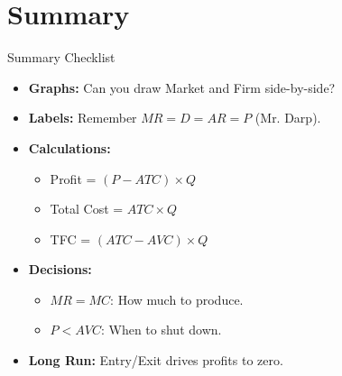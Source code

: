 \documentclass[aspectratio=169, 10pt]{beamer}
\begin{document}
\section{Summary}

\begin{frame}{Summary Checklist}
    \begin{itemize}
        \item \textbf{Graphs:} Can you draw Market and Firm side-by-side?
        \item \textbf{Labels:} Remember $MR = D = AR = P$ (Mr. Darp).
        \item \textbf{Calculations:} 
            \begin{itemize}
                \item Profit = $(P - ATC) \times Q$
                \item Total Cost = $ATC \times Q$
                \item TFC = $(ATC - AVC) \times Q$
            \end{itemize}
        \item \textbf{Decisions:}
            \begin{itemize}
                \item $MR = MC$: How much to produce.
                \item $P < AVC$: When to shut down.
            \end{itemize}
        \item \textbf{Long Run:} Entry/Exit drives profits to zero.
    \end{itemize}
\end{frame}
\end{document}
